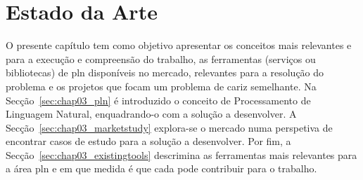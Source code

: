\chapter{Estado da Arte}
\label{chap:Chapter3}
O presente capítulo tem como objetivo apresentar os conceitos mais relevantes e para a execução e compreensão do trabalho, as ferramentas (serviços ou bibliotecas) de \gls{pln} disponíveis no mercado, relevantes para a resolução do problema e os projetos que focam um problema de cariz semelhante. Na Secção~\ref{sec:chap03_pln} é introduzido o conceito de Processamento de Linguagem Natural, enquadrando-o com a solução a desenvolver. A Secção~\ref{sec:chap03_marketstudy} explora-se o mercado numa perspetiva de encontrar casos de estudo para a solução a desenvolver. Por fim, a Secção~\ref{sec:chap03_existingtools} descrimina as ferramentas mais relevantes para a área \gls{pln} e em que medida é que cada pode contribuir para o trabalho. 






